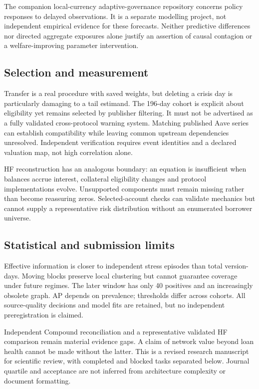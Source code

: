 \documentclass[
  10pt,
  a4paper,
]{article}
\begin{document}
The companion local-currency adaptive-governance repository concerns
policy responses to delayed observations. It is a separate modelling
project, not independent empirical evidence for these forecasts. Neither
predictive differences nor directed aggregate exposures alone justify an
assertion of causal contagion or a welfare-improving parameter
intervention.

\subsection{Selection and measurement}\label{selection-and-measurement}

Transfer is a real procedure with saved weights, but deleting a crisis
day is particularly damaging to a tail estimand. The 196-day cohort is
explicit about eligibility yet remains selected by publisher filtering.
It must not be advertised as a fully validated cross-protocol warning
system. Matching published Aave series can establish compatibility while
leaving common upstream dependencies unresolved. Independent
verification requires event identities and a declared valuation map, not
high correlation alone.

HF reconstruction has an analogous boundary: an equation is insufficient
when balances accrue interest, collateral eligibility changes and
protocol implementations evolve. Unsupported components must remain
missing rather than become reassuring zeros. Selected-account checks can
validate mechanics but cannot supply a representative risk distribution
without an enumerated borrower universe.

\subsection{Statistical and submission
limits}\label{statistical-and-submission-limits}

Effective information is closer to independent stress episodes than
total version-days. Moving blocks preserve local clustering but cannot
guarantee coverage under future regimes. The later window has only 40
positives and an increasingly obsolete graph. AP depends on prevalence;
thresholds differ across cohorts. All source-quality decisions and model
fits are retained, but no independent preregistration is claimed.

Independent Compound reconciliation and a representative validated HF
comparison remain material evidence gaps. A claim of network value
beyond loan health cannot be made without the latter. This is a revised
research manuscript for scientific review, with completed and blocked
tasks separated below. Journal quartile and acceptance are not inferred
from architecture complexity or document formatting.
\end{document}

